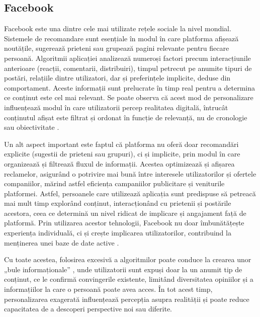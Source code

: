 \subsection*{Facebook}
Facebook este una dintre cele mai utilizate rețele sociale la nivel mondial.
Sistemele de recomandare sunt esențiale în modul în care platforma afișează noutățile, sugerează prieteni sau grupează pagini relevante pentru fiecare persoană.
Algoritmii aplicației analizează numeroși factori precum interacțiunile anterioare (reacții, comentarii, distribuiri), timpul petrecut pe anumite tipuri de postări, relațiile dintre utilizatori, dar și preferințele implicite, deduse din comportament.
Aceste informații sunt prelucrate în timp real pentru a determina ce conținut este cel mai relevant. 
Se poate observa că acest mod de personalizare influențează modul în care utilizatorii percep realitatea digitală, întrucât conținutul afișat este filtrat și ordonat în funcție de relevanță, nu de cronologie sau obiectivitate \cite{baatarjav2008group}.
\par
Un alt aspect important este faptul că platforma nu oferă doar recomandări explicite (sugestii de prieteni sau grupuri), ci și implicite, prin modul în care organizează și filtrează fluxul de informații. 
Acestea optimizează și afișarea reclamelor, asigurând o potrivire mai bună între interesele utilizatorilor și ofertele companiilor, mărind astfel eficiența campaniilor publicitare și veniturile platformei.
Astfel, persoanele care utilizează aplicația sunt predispuse să petreacă mai mult timp explorând conținut, interacționând cu prietenii și postările acestora, ceea ce determină un nivel ridicat de implicare și angajament față de platformă.
Prin utilizarea acestor tehnologii, Facebook nu doar îmbunătățește experiența individuală, ci și crește implicarea utilizatorilor, contribuind la menținerea unei baze de date active \cite{heimbach2015value}.
\par
Cu toate acestea, folosirea excesivă a algoritmilor poate conduce la crearea unor „bule informaționale” \cite{nguyen2014exploring}, unde utilizatorii sunt expuși doar la un anumit tip de conținut, ce le confirmă convingerile existente, limitând diversitatea opiniilor și a informațiilor la care o persoană poate avea acces.
În tot acest timp, personalizarea exagerată influențează percepția asupra realității și poate reduce capacitatea de a descoperi perspective noi sau diferite.

